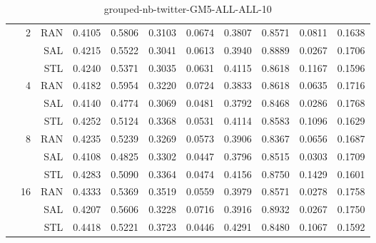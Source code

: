 \begin{center}
\begin{table}[htbp]
\begin{center}
\begin{tabular}{ | r | r | r | r | r | r | r | r | r | r | r |}
 & \multirow{3}{*}{2} & RAN & 0.4105 & 0.5806 & 0.3103 & 0.0674 & 0.3807 & 0.8571 & 0.0811 & 0.1638\\ \cline{3-11}
 &   & SAL & 0.4215 & 0.5522 & 0.3041 & 0.0613 & 0.3940 & 0.8889 & 0.0267 & 0.1706\\ \cline{3-11}
 &   & STL & 0.4240 & 0.5371 & 0.3035 & 0.0631 & 0.4115 & 0.8618 & 0.1167 & 0.1596\\ \cline{2-11}
 & \multirow{3}{*}{4} & RAN & 0.4182 & 0.5954 & 0.3220 & 0.0724 & 0.3833 & 0.8618 & 0.0635 & 0.1716\\ \cline{3-11}
 &   & SAL & 0.4140 & 0.4774 & 0.3069 & 0.0481 & 0.3792 & 0.8468 & 0.0286 & 0.1768\\ \cline{3-11}
 &   & STL & 0.4252 & 0.5124 & 0.3368 & 0.0531 & 0.4114 & 0.8583 & 0.1096 & 0.1629\\ \cline{2-11}
 & \multirow{3}{*}{8} & RAN & 0.4235 & 0.5239 & 0.3269 & 0.0573 & 0.3906 & 0.8367 & 0.0656 & 0.1687\\ \cline{3-11}
 &   & SAL & 0.4108 & 0.4825 & 0.3302 & 0.0447 & 0.3796 & 0.8515 & 0.0303 & 0.1709\\ \cline{3-11}
 &   & STL & 0.4283 & 0.5090 & 0.3364 & 0.0474 & 0.4156 & 0.8750 & 0.1429 & 0.1601\\ \cline{2-11}
 & \multirow{3}{*}{16} & RAN & 0.4333 & 0.5369 & 0.3519 & 0.0559 & 0.3979 & 0.8571 & 0.0278 & 0.1758\\ \cline{3-11}
 &   & SAL & 0.4207 & 0.5606 & 0.3228 & 0.0716 & 0.3916 & 0.8932 & 0.0267 & 0.1750\\ \cline{3-11}
 &   & STL & 0.4418 & 0.5221 & 0.3723 & 0.0446 & 0.4291 & 0.8480 & 0.1067 & 0.1592\\ \cline{2-11}
\hline
\end{tabular}
\caption{grouped-nb-twitter-GM5-ALL-ALL-10}
\end{center}
 \end{table}
\end{center}

